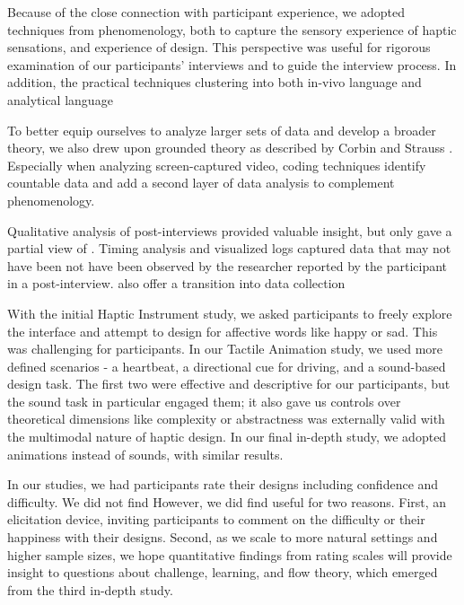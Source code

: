 Because of the close connection with participant experience, we adopted techniques from phenomenology, both to capture the sensory experience of haptic sensations, and  experience of design.
This perspective was useful for rigorous examination of our participants' interviews and to guide the interview process.
In addition, the practical techniques  clustering  into both in-vivo language and analytical language  %

To better equip ourselves to analyze larger sets of data and develop a broader theory, we also drew upon grounded theory as described by Corbin and Strauss \cite{Corbin2008}.
Especially when analyzing screen-captured video, coding techniques  identify countable data and add a second layer of data analysis to complement phenomenology.

Qualitative analysis of post-interviews provided valuable insight, but only gave a partial view of \osE{\haxd}.
Timing analysis and visualized logs captured data that may not have been not have been observed by the researcher  reported by the participant in a post-interview.
 also offer a transition into  data collection 

With the initial Haptic Instrument study, we asked participants to freely explore the interface and attempt to design for affective words like happy or sad.
This was challenging for participants. %
In our Tactile Animation study, we used more defined scenarios - a heartbeat, a directional cue for driving, and a sound-based design task.
The first two were effective and descriptive for our participants, but the sound task in particular engaged them; it also gave us controls over theoretical dimensions like complexity or abstractness  was externally valid with the multimodal nature of haptic design.
In our final in-depth study, we adopted animations instead of sounds, with similar results.

In our studies, we had participants rate their designs including confidence and difficulty.
We did not find  %
However, we did find  useful for two reasons.
First,  an elicitation device, inviting participants to  comment on the difficulty or their happiness with their designs.
Second, as we scale to more natural settings and higher sample sizes, we hope quantitative findings from rating scales will provide insight to questions about challenge, learning, and flow theory, which emerged from the third in-depth study.




